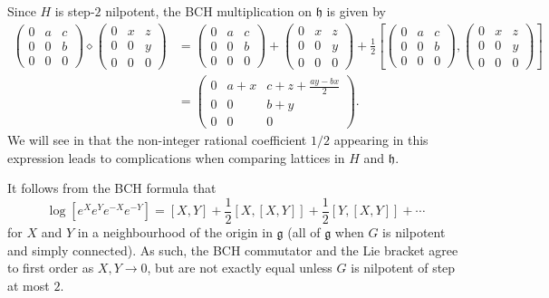 \begin{example}
\[\]
Since $H$ is step-$2$ nilpotent, the BCH multiplication on $\mathfrak{h}$ is given by
\begin{align*}
\left(\begin{matrix} 0 & a & c \\ 0 & 0 & b \\ 0&0&0\end{matrix}\right)\diamond \left(\begin{matrix} 0 & x & z \\ 0 & 0 & y \\ 0&0&0\end{matrix}\right) 
&=\left(\begin{matrix} 0 & a & c \\ 0 & 0 & b \\ 0&0&0\end{matrix}\right) + \left(\begin{matrix} 0 & x & z \\ 0 & 0 & y \\ 0&0&0\end{matrix}\right) +  \frac{1}{2}\left[\left(\begin{matrix} 0 & a & c \\ 0 & 0 & b \\ 0&0&0\end{matrix}\right),\left(\begin{matrix} 0 & x & z \\ 0 & 0 & y \\ 0&0&0\end{matrix}\right)\right] \\
&=\left(\begin{matrix} 0 & a+x & c+z+\frac{ay-bx}{2} \\ 0 & 0 & b+y \\ 0&0&0\end{matrix}\right).
\end{align*}
We will see in  that the non-integer rational coefficient $1/2$ appearing in this expression leads to complications when comparing lattices in $H$ and $\mathfrak{h}$.
\end{example}

\begin{remark}
It follows from the BCH formula that
\[
\log [e^X e^Y e^{-X}e^{-Y}] 
%
%
= [X,Y]+\frac{1}{2}[X,[X,Y]]+\frac{1}{2}[Y,[X,Y]]+\cdots
\]
for $X$ and $Y$ in a neighbourhood of the origin in $\mathfrak{g}$ (all of $\mathfrak{g}$ when $G$ is nilpotent and simply connected). As such, the BCH commutator and the Lie bracket agree to first order as $X,Y\to 0$, but are not exactly equal unless $G$ is nilpotent of step at most $2$.
\end{remark}

